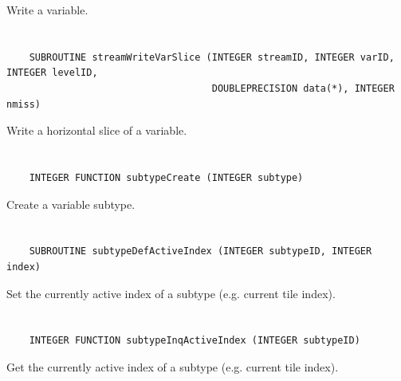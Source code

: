 Write a variable.


\section*{\tt {}}

\begin{verbatim}
    SUBROUTINE streamWriteVarSlice (INTEGER streamID, INTEGER varID, INTEGER levelID,
                                    DOUBLEPRECISION data(*), INTEGER nmiss)
\end{verbatim}

Write a horizontal slice of a variable.


\section*{\tt {}}

\begin{verbatim}
    INTEGER FUNCTION subtypeCreate (INTEGER subtype)
\end{verbatim}

Create a variable subtype.


\section*{\tt {}}

\begin{verbatim}
    SUBROUTINE subtypeDefActiveIndex (INTEGER subtypeID, INTEGER index)
\end{verbatim}

Set the currently active index of a subtype (e.g. current tile index).


\section*{\tt {}}

\begin{verbatim}
    INTEGER FUNCTION subtypeInqActiveIndex (INTEGER subtypeID)
\end{verbatim}

Get the currently active index of a subtype (e.g. current tile index).


\section*{\tt {}}

